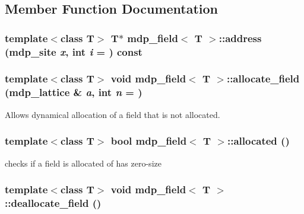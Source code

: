 \subsection{Member Function Documentation}
\hypertarget{classmdp__field_ab2159a8078313482a60a08e6f3b81209}{
\subsubsection[{address}]{\setlength{\rightskip}{0pt plus 5cm}template$<$class T$>$ T$\ast$ {\bf mdp\_\-field}$<$ T $>$::address ({\bf mdp\_\-site} {\em x}, \/  int {\em i} = {}) const}}
\label{classmdp__field_ab2159a8078313482a60a08e6f3b81209}
\hypertarget{classmdp__field_ab76ac5e0273aa3e1b5070fc3d7a0dc84}{
\subsubsection[{allocate\_\-field}]{\setlength{\rightskip}{0pt plus 5cm}template$<$class T$>$ void {\bf mdp\_\-field}$<$ T $>$::allocate\_\-field ({\bf mdp\_\-lattice} \& {\em a}, \/  int {\em n} = {})}}
\label{classmdp__field_ab76ac5e0273aa3e1b5070fc3d7a0dc84}


Allows dynamical allocation of a field that is not allocated. \hypertarget{classmdp__field_ad306195eb4961253cef69e5fb33bce69}{
\subsubsection[{allocated}]{\setlength{\rightskip}{0pt plus 5cm}template$<$class T$>$ bool {\bf mdp\_\-field}$<$ T $>$::allocated ()}}
\label{classmdp__field_ad306195eb4961253cef69e5fb33bce69}


checks if a field is allocated of has zero-\/size \hypertarget{classmdp__field_ab063254fe74b88b1c9cc9e0cbc843b4b}{
\subsubsection[{deallocate\_\-field}]{\setlength{\rightskip}{0pt plus 5cm}template$<$class T$>$ void {\bf mdp\_\-field}$<$ T $>$::deallocate\_\-field ()}}
\label{classmdp__field_ab063254fe74b88b1c9cc9e0cbc843b4b}


